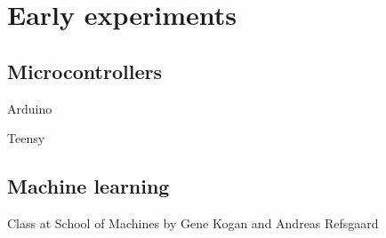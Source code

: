 \chapter{Early experiments}

\section{Microcontrollers}

Arduino

Teensy

\section{Machine learning}

Class at School of Machines by Gene Kogan and Andreas Refsgaard

